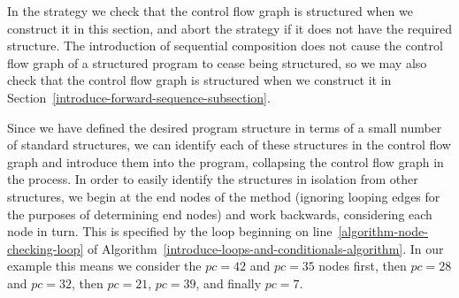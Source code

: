 

In the strategy we check that the control flow graph is structured
when we construct it in this section, and abort the strategy if it
does not have the required structure.
The introduction of sequential composition does not cause the control
flow graph of a structured program to cease being structured, so we
may also check that the control flow graph is structured when we
construct it in
Section~\ref{introduce-forward-sequence-subsection}.


Since we have defined the desired program structure in terms of a
small number of standard structures, we can identify each of these
structures in the control flow graph and introduce them into the
program, collapsing the control flow graph in the process.
In order to easily identify the structures in isolation from other
structures, we begin at the end nodes of the method (ignoring looping
edges for the purposes of determining end nodes) and work backwards,
considering each node in turn.
This is specified by the loop beginning on
line~\ref{algorithm-node-checking-loop} of
Algorithm~\ref{introduce-loops-and-conditionals-algorithm}.
In our example this means we consider the $pc=42$ and $pc=35$ nodes
first, then $pc=28$ and $pc=32$, then $pc=21$, $pc=39$, and finally
$pc=7$.

